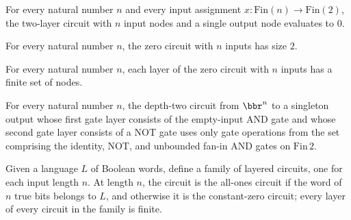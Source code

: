 \begin{theorem}
\leanok
{}
For every natural number $n$ and every input assignment $x : \mathrm{Fin}(n) \to
\mathrm{Fin}(2)$, the two-layer circuit with $n$ input nodes and a single output node
evaluates to $0$.
\end{theorem}

\begin{theorem}
\label{BoolCircuit.constZeroCircuit_size}
\leanok
{}
For every natural number $n$, the zero circuit with $n$ inputs has size $2$.
\end{theorem}

\begin{theorem}
\label{BoolCircuit.constZeroCircuit_finite}
\leanok
{}
For every natural number $n$, each layer of the zero circuit with $n$ inputs has a
finite set of nodes.
\end{theorem}

\begin{theorem}
\label{BoolCircuit.constZeroCircuit_onlyUsesGates}
\leanok
{}
For every natural number $n$, the depth-two circuit from $\bbr^n$ to a singleton output
whose first gate layer consists of the empty-input AND gate and whose second gate layer
consists of a NOT gate uses only gate operations from the set comprising the identity,
NOT, and unbounded fan-in AND gates on $\mathrm{Fin}\,2$.
\end{theorem}

\begin{definition}
\label{BoolCircuit.unaryFamily}
\leanok
{}
Given a language $L$ of Boolean words, define a family of layered circuits, one for each
input length $n$. At length $n$, the circuit is the all-ones circuit if the word of $n$
true bits belongs to $L$, and otherwise it is the constant-zero circuit; every layer of
every circuit in the family is finite.
\end{definition}

